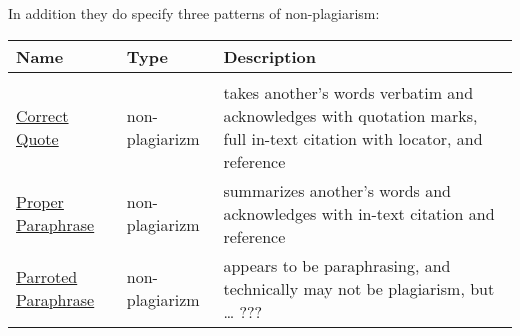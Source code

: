 In addition they do specify  three patterns of
non-plagiarism:

\begin{tabular}{p{2cm}p{4cm}p{8cm}}
Name & Type & Description \\
\hline
\\
  \href{patternCorrectQuote.html}{Correct Quote} &  non-plagiarizm & takes another's words
  verbatim and acknowledges with quotation marks, full in-text citation
  with locator, and reference
\\
  \href{patternProperParaphrase.html}{Proper Paraphrase} &  non-plagiarizm & summarizes
  another's words and acknowledges with in-text citation and reference
\\
  \href{patternMindlessParaphrase.html}{Parroted Paraphrase} &  non-plagiarizm & appears to
  be paraphrasing, and technically may not be plagiarism, but \ldots{}
  ???
\end{tabular}
